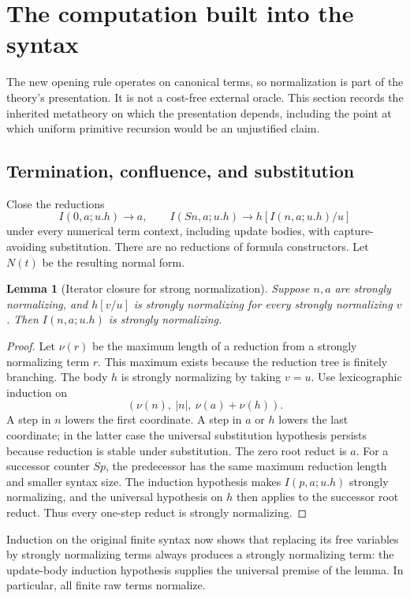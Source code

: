\documentclass[11pt,letterpaper]{article}
\newtheorem{lemma}[theorem]{Lemma}
\theoremstyle{definition}
\begin{document}
\section{The computation built into the syntax}
\label{sec:normalization}

The new opening rule operates on canonical terms, so normalization is part
of the theory's presentation.  It is not a cost-free external oracle.
This section records the inherited metatheory on which the presentation
depends, including the point at which uniform primitive recursion would be
an unjustified claim.\cite{fullnf}

\subsection{Termination, confluence, and substitution}

Close the reductions
\[
 I(0,a;u.h)\longrightarrow a,
 \qquad
 I(Sn,a;u.h)\longrightarrow h[I(n,a;u.h)/u]
\]
under every numerical term context, including update bodies, with
capture-avoiding substitution.  There are no reductions of formula
constructors.  Let $N(t)$ be the resulting normal form.

\begin{lemma}[Iterator closure for strong normalization]
Suppose $n,a$ are strongly normalizing, and $h[v/u]$ is strongly
normalizing for every strongly normalizing $v$.  Then $I(n,a;u.h)$ is
strongly normalizing.
\end{lemma}
\begin{proof}
Let $\nu(r)$ be the maximum length of a reduction from a strongly
normalizing term $r$.  This maximum exists because the reduction tree is
finitely branching.  The body $h$ is strongly normalizing by taking $v=u$.
Use lexicographic induction on
\[
       (\nu(n),\ |n|,\ \nu(a)+\nu(h)).
\]
A step in $n$ lowers the first coordinate.  A step in $a$ or $h$ lowers
the last coordinate; in the latter case the universal substitution
hypothesis persists because reduction is stable under substitution.
The zero root reduct is $a$.  For a successor counter $Sp$, the predecessor
has the same maximum reduction length and smaller syntax size.  The
induction hypothesis makes $I(p,a;u.h)$ strongly normalizing, and the
universal hypothesis on $h$ then applies to the successor root reduct.
Thus every one-step reduct is strongly normalizing.
\end{proof}

Induction on the original finite syntax now shows that replacing its free
variables by strongly normalizing terms always produces a strongly
normalizing term: the update-body induction hypothesis supplies the
universal premise of the lemma.  In particular, all finite raw terms
normalize.
\end{document}
